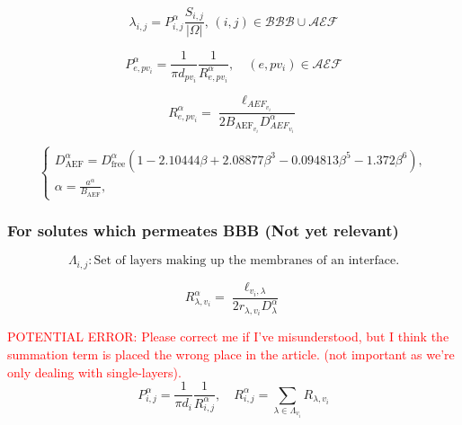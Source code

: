 \documentclass{article}
\theoremstyle{definition}
\theoremstyle{plain}
\theoremstyle{remark}
\newcommand{\ISSUE}[1]{\textcolor{red}{POTENTIAL ERROR: #1}}
\begin{document}
\begin{equation}
    \lambda_{i, j} = P^\alpha_{i, j} \frac{S_{i, j}}{\lvert \Omega \rvert}, \, (i, j) \in \mathcal{BBB} \cup \mathcal{AEF}
\label{eq: diffusive transfer coefficient} 
\end{equation}



\begin{equation}
    P^\alpha_{e, pv_i} = \frac{1}{\pi d_{pv_i}}\frac{1}{R^\alpha_{e, pv_i}}, \quad (e, pv_i) \in \mathcal{AEF}
\label{eq: diffusive permeability aef} 
\end{equation}

\begin{equation}
    R^\alpha_{e, pv_i} = \frac{\ell_{AEF_{v_i}}}{2B_{\text{AEF}_{v_i}} D^\alpha_{AEF_{v_i}}}
\end{equation}

\begin{equation}
    \begin{cases}
    D^\alpha_\text{AEF} = D^\alpha_\text{free}\left(1-2.10444\beta +2.08877\beta^3 - 0.094813\beta^5 - 1.372\beta^6 \right),\\
    \alpha = \frac{a^\alpha}{B_\text{AEF}},
    \end{cases}
\end{equation}


\subsubsection*{For solutes which permeates BBB (Not yet relevant)}
\begin{equation}
    \Lambda_{i, j}: \text{Set of layers making up the membranes of an interface.}
\label{eq: layer set} 
\end{equation}

\begin{equation}
R^\alpha_{\lambda, v_i} = \frac{\ell_{v_i, \lambda}}{2 r_{\lambda, v_i} D^\alpha_{\lambda}}
\end{equation}

\ISSUE{Please correct me if I've misunderstood, but I think the summation term is placed the wrong place in the article. (not important as we're only dealing with single-layers).}
\begin{equation}
    P^\alpha_{i, j} = \frac{1}{\pi d_{i}} \frac{1}{R^\alpha_{i, j}}, \quad R_{i, j}^\alpha=\sum_{\lambda \in \Lambda_{v_i}} R_{\lambda, v_i}
\label{eq: convective solute transfer} 
\end{equation}
\end{document}
